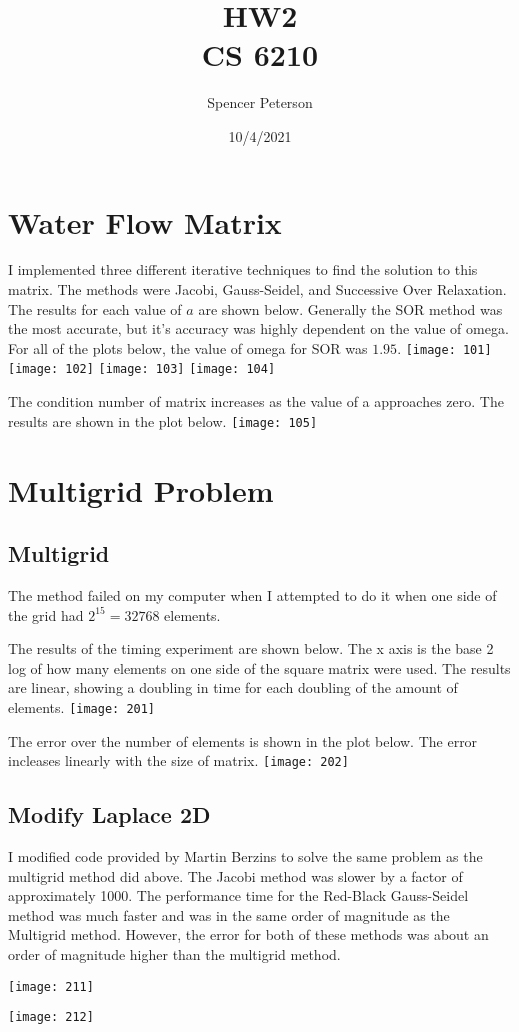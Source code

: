 \documentclass{article}
\title{HW2 \\
	\large CS 6210}
\date{10/4/2021}
\author{Spencer Peterson}
\begin{document}
\maketitle

 \section{Water Flow Matrix}
 
 I implemented three different iterative techniques to find the solution to this matrix. The methods were Jacobi, Gauss-Seidel, and Successive Over Relaxation. The results for each value of $a$ are shown below. Generally the SOR method was the most accurate, but it's accuracy was highly dependent on the value of omega. For all of the plots below, the value of omega for SOR was $1.95$.
 \texttt{[image: 101]}
 \texttt{[image: 102]}
 \texttt{[image: 103]}
 \texttt{[image: 104]}

The condition number of matrix increases as the value of a approaches zero. The results are shown in the plot below. 
\texttt{[image: 105]}

 
 
 \section{Multigrid Problem}

\subsection{Multigrid}

The method failed on my computer when I attempted to do it when one side of the grid had $2^15=32768$ elements. 

The results of the timing experiment are shown below. The x axis is the base 2 log of how many elements on one side of the square matrix were used. The results are linear, showing a doubling in time for each doubling of the amount of elements.
 \texttt{[image: 201]}

 The error over the number of elements is shown in the plot below. The error incleases linearly with the size of matrix.
  \texttt{[image: 202]}


\subsection{Modify Laplace 2D}

I modified code provided by Martin Berzins to solve the same problem as the multigrid method did above. The Jacobi method was slower by a factor of approximately 1000. The performance time for the Red-Black Gauss-Seidel method was much faster and was in the same order of magnitude as the Multigrid method. However, the error for both of these methods was about an order of magnitude higher than the multigrid method. 



 \texttt{[image: 211]}
 
  \texttt{[image: 212]}
\end{document}
